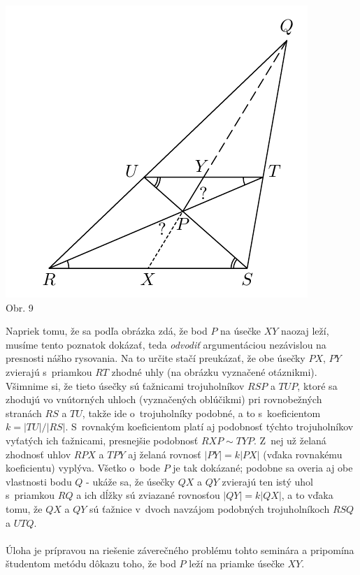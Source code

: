 \rieh
\begin{center}
\includegraphics{obrazky/66D51}\\

Obr. 9
\end{center}
Napriek tomu, že sa podľa obrázka zdá, že bod $P$ na úsečke $XY$ naozaj leží, musíme tento poznatok dokázať, teda \textit{odvodiť} argumentáciou nezávislou na presnosti nášho rysovania. Na to určite stačí preukázať, že obe úsečky $PX$, $PY$ zvierajú s~priamkou $RT$ zhodné uhly (na obrázku vyznačené otáznikmi). Všimnime si, že tieto úsečky sú ťažnicami trojuholníkov $RSP$ a $TUP$, ktoré sa zhodujú vo vnútorných uhloch (vyznačených oblúčikmi) pri rovnobežných stranách $RS$ a $TU$, takže ide o~trojuholníky podobné, a to s~koeficientom $k = |TU|/|RS|$. S~rovnakým koeficientom platí aj podobnosť  týchto trojuholníkov vyťatých ich ťažnicami, presnejšie podobnosť $RXP \sim TYP$. Z~nej už želaná zhodnosť uhlov $RPX$ a $TPY$ aj želaná rovnosť $|PY | = k|PX|$ (vďaka rovnakému koeficientu) vyplýva. Všetko o~bode $P$ je tak dokázané; podobne sa overia aj obe vlastnosti bodu $Q$ - ukáže sa, že úsečky $QX$ a $QY$ zvierajú ten istý uhol s~priamkou $RQ$ a ich dĺžky sú zviazané rovnosťou $|QY | = k|QX|$, a to vďaka tomu, že $QX$ a $QY$ sú ťažnice v~dvoch navzájom podobných trojuholníkoch $RSQ$ a $UTQ$.\\
\\
\kom Úloha je prípravou na riešenie záverečného problému tohto seminára a pripomína študentom metódu dôkazu toho, že bod $P$ leží na priamke úsečke $XY$.\\
